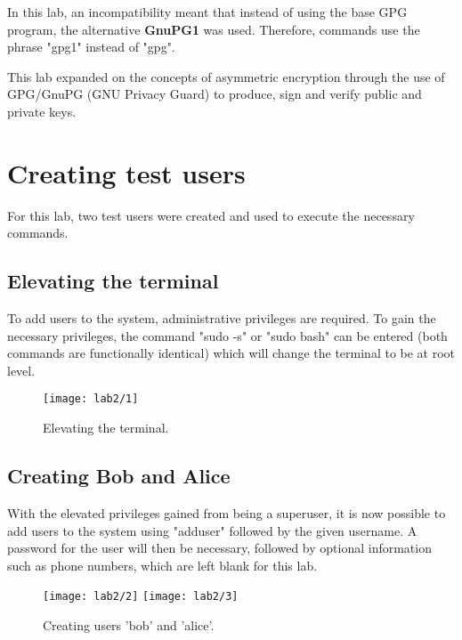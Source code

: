 \begin{tcolorbox}[colback=red!5!white,colframe=red!75!black,title=Important note]
    In this lab, an incompatibility meant that instead
    of using the base GPG program, the alternative \textbf{GnuPG1} was used.
    Therefore, commands use the phrase "gpg1" instead of "gpg".
\end{tcolorbox}

This lab expanded on the concepts of asymmetric encryption through the use of\newline
GPG/GnuPG (GNU Privacy Guard) to produce, sign and verify public and private keys.\\

\section{Creating test users}\label{sec:testUsers}
For this lab, two test users were created and used to execute the necessary commands.

\subsection{Elevating the terminal}\label{subsec:sudo}
To add users to the system, administrative privileges are required.
To gain the necessary privileges, the command "sudo -s" or "sudo bash" can be entered
(both commands are functionally identical) which will change the terminal to be at root level.

\begin{figure}[H]
    \centering
    \texttt{[image: lab2/1]}
    \caption{Elevating the terminal.}
    \label{fig:sudo}
\end{figure}

\subsection{Creating Bob and Alice}\label{subsec:createUsers}
With the elevated privileges gained from being a superuser, it is now possible to add users to the system using
"adduser" followed by the given username.
A password for the user will then be necessary, followed by optional information such as phone
numbers, which are left blank for this lab.

\begin{figure}[H]
    \centering
    \texttt{[image: lab2/2]}
    \texttt{[image: lab2/3]}
    \caption{Creating users 'bob' and 'alice'.}
    \label{fig:createBob}
\end{figure}

